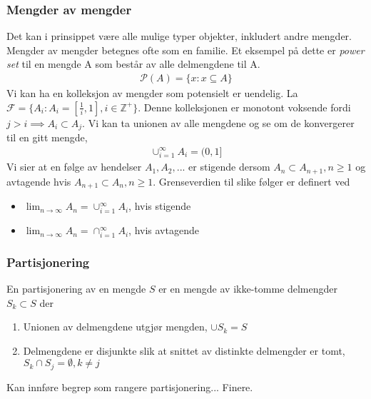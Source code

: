 \subsubsection{Mengder av mengder}
Det kan i prinsippet være alle mulige typer objekter, inkludert andre mengder. Mengder av mengder betegnes ofte som en familie. Et eksempel på dette er \textit{power set} til en mengde A som består av alle delmengdene til A.
\begin{align}
\mathscr{P}(A) = \{x:x\subseteq A \}
\end{align}
Vi kan ha en kolleksjon av mengder som potensielt er uendelig. La $\mathcal{F}=\{A_i: A_i = [\frac{1}{i},1], i \in \mathbb{Z}^+\}$. Denne kolleksjonen er monotont voksende fordi $j>i \implies A_i \subset A_j$. Vi kan ta unionen av alle mengdene og se om de konvergerer til en gitt mengde,
\begin{align}
\cup_{i=1}^{\infty} A_i = (0,1]
\end{align}
Vi sier at en følge av hendelser $A_1, A_2,...$ er stigende dersom $A_n \subset A_{n+1}, n \geq 1$ og avtagende hvis $A_{n+1} \subset A_n, n \geq 1$. Grenseverdien til slike følger er definert ved
\begin{itemize}
\item $\lim_{n\to\infty} A_n = \cup_{i=1}^{\infty} A_i$, hvis stigende
\item $\lim_{n\to\infty} A_n = \cap_{i=1}^{\infty} A_i$, hvis avtagende
\end{itemize}
\subsubsection{Partisjonering}
En partisjonering av en mengde $S$ er en mengde av ikke-tomme delmengder $S_k \subset S$ der
\begin{enumerate}
\item Unionen av delmengdene utgjør mengden, $\cup S_k = S$
\item Delmengdene er disjunkte slik at snittet av distinkte delmengder er tomt, $S_k\cap S_j = \emptyset, k\neq j$
\end{enumerate}
Kan innføre begrep som rangere partisjonering... Finere. 
